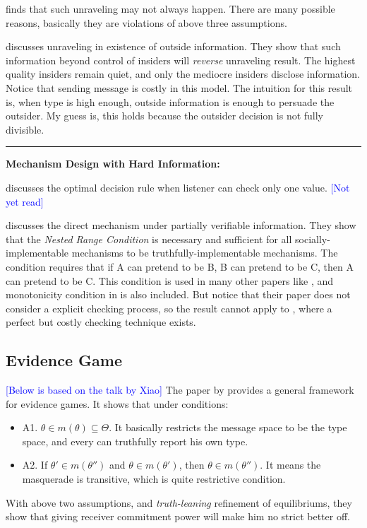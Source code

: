 \documentclass{book}
\theoremstyle{plain}
\theoremstyle{definition}
\newcommand{\myline}{\vspace{3mm} \hrule \vspace{4mm}}
\begin{document}
\cite{Dye:1985a} finds that such unraveling may not always happen.
There are many possible reasons, basically they are violations of above three assumptions.

\cite{Quigley:2017us} discusses unraveling in existence of outside information. They show that such information beyond control of insiders will \textit{reverse} unraveling result.
The highest quality insiders remain quiet, and only the mediocre insiders disclose information.
Notice that sending message is costly in this model.
The intuition for this result is,
when type is high enough,
outside information is enough to persuade the outsider.
My guess is,
this holds because the outsider decision is not fully divisible.

\myline
\noindent
\textbf{Mechanism Design with Hard Information:}

\cite{galzer_ruinstein:emca04} discusses the optimal decision rule when listener can check only one value.
\textcolor{blue}{[Not yet read]}

\cite{Green:1986gs} discusses the direct mechanism under partially verifiable information. 
They show that the \textit{Nested Range Condition} is necessary and sufficient for all socially-implementable mechanisms to be truthfully-implementable mechanisms.
The condition requires that if A can pretend to be B,
B can pretend to be C, then A can pretend to be C.
This condition is used in many other papers like \cite{Hart_et:17aer_evidence_games}, and monotonicity condition in \cite{Grossman:1981ih} is also included.
But notice that their paper does not consider a explicit checking process, so the result cannot apply to \cite{BenPorath:2014bc}, where a perfect but costly checking technique exists.



\subsection{Evidence Game} %
\label{sub:evidence_game}

\textcolor{blue}{[Below is based on the talk by Xiao]}
The paper by \cite{Hart_et:17aer_evidence_games} provides a general framework for evidence games. It shows that under conditions:
\begin{itemize}
	\item A1. $\theta \in m(\theta) \subseteq \Theta$.
	It basically restricts the message space to be the type space, and every can truthfully report his own type.
	\item A2. If $\theta' \in m(\theta'')$ and $\theta \in m(\theta')$, then $\theta \in m(\theta'')$. It means the masquerade is transitive, which is quite restrictive condition.
\end{itemize}
With above two assumptions, and \textit{truth-leaning} refinement of equilibriums, they show that giving receiver commitment power will make him no strict better off.
\end{document}
